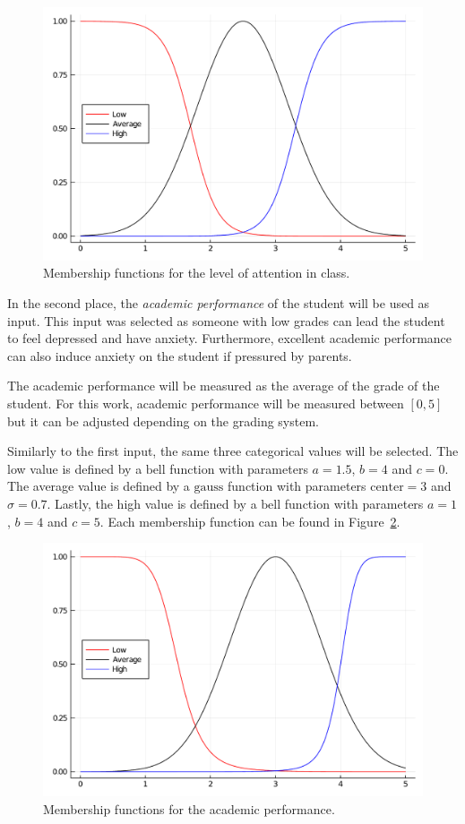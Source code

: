 \documentclass[conference]{IEEEtran}
\theoremstyle{definition}
\theoremstyle{remark}
\theoremstyle{remark}
\begin{document}
\begin{figure}[t]
  \centering
  \includegraphics[scale=.3]{figs/att.pdf}
  \caption{Membership functions for the level of attention in class.}
  \label{fig:att_mf}
\end{figure}

In the second place, the \textit{academic performance} of the student will be
used as input. This input was selected as someone with low grades can lead the
student to feel depressed and have anxiety. Furthermore, excellent academic
performance can also induce anxiety on the student if pressured by parents.

The academic performance will be measured as the average of the grade of the
student. For this work, academic performance will be measured between $[0, 5]$
but it can be adjusted depending on the grading system.

Similarly to the first input, the same three categorical values will be
selected. The low value is defined by a $\mathrm{bell}$ function with parameters
$a=1.5$, $b = 4$ and $c=0$. The average value is defined by a $\mathrm{gauss}$
function with parameters $\mathrm{center}=3$ and $\sigma = 0.7$. Lastly, the
high value is defined by a $\mathrm{bell}$ function with parameters $a = 1$,
$b=4$ and $c=5$. Each membership function can be found in
Figure~\ref{fig:ap_mf}.

\begin{figure}[t]
  \centering
  \includegraphics[scale=.3]{figs/ap.pdf}
  \caption{Membership functions for the academic performance.}
  \label{fig:ap_mf}
\end{figure}
\end{document}
